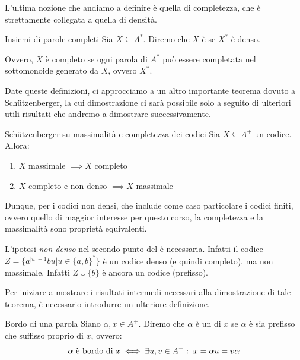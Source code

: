 L'ultima nozione che andiamo a definire è quella di completezza, che è strettamente collegata a quella di densità.
\begin{definition}{Insiemi di parole completi}
  Sia \(X \subseteq A^*\). Diremo che \(X\) è  se \(X^*\) è denso.

  Ovvero, \(X\) è completo se ogni parola di \(A^*\) può essere completata nel sottomonoide generato da \(X\), ovvero \(X^*\).
\end{definition}

Date queste definizioni, ci approcciamo a un altro importante teorema dovuto a Schützenberger, la cui dimostrazione ci sarà possibile solo a seguito di ulteriori utili risultati che andremo a dimostrare successivamente.

\begin{theorem}[label=thm:schutz_maximality_completeness]{Schützenberger su massimalità e completezza dei codici}
  Sia \(X \subseteq A^+\) un codice.
  Allora:
  \begin{enumerate}
    \item \(X\) massimale \(\implies X\) completo
    \item \(X\) completo e non denso \(\implies X\) massimale
  \end{enumerate}
\end{theorem}

Dunque, per i codici non densi, che include come caso particolare i codici finiti, ovvero quello di maggior interesse per questo corso, la completezza e la massimalità sono proprietà equivalenti.

\begin{observation}{}
  L'ipotesi \emph{non denso} nel secondo punto del  è necessaria. Infatti il codice \(Z = \{a^{|u|+1}bu | u \in {\{a,b\}}^*\}\) è un codice denso (e quindi completo), ma non massimale.
  Infatti \(Z\cup\{b\}\) è ancora un codice (prefisso).
\end{observation}

Per iniziare a mostrare i risultati intermedi necessari alla dimostrazione di tale teorema, è necessario introdurre un ulteriore definizione.
\begin{definition}{Bordo di una parola}
  Siano \(\alpha,x \in A^+\). Diremo che \(\alpha\) è un  di \(x\) se \(\alpha\) è sia prefisso che suffisso proprio di \(x\), ovvero:
  \[\alpha \text{ è bordo di } x \iff \exists u,v \in A^+ :\; x = \alpha u = v \alpha\]
\end{definition}

